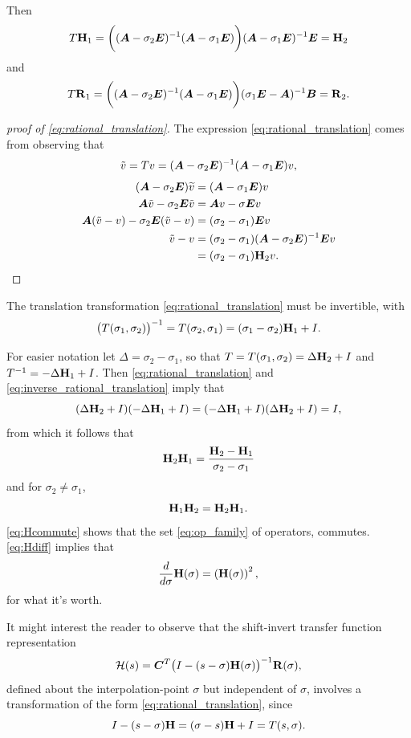 Then
\[
T \textbf{\textup{H}}_1 = \bigg((\bm{A}-\sigma_2 \bm{E})^{-1}(\bm{A}-\sigma_1 \bm{E}) \bigg) (\bm{A} - \sigma_1 \bm{E})^{-1}\bm{E} = \textbf{\textup{H}}_2
\]
and
\[
T \textbf{\textup{R}}_1 = \bigg((\bm{A}-\sigma_2 \bm{E})^{-1}(\bm{A}-\sigma_1 \bm{E}) \bigg) (\sigma_1 \bm{E}-\bm{A})^{-1}\bm{B} = \textbf{\textup{R}}_2.
\]


\begin{proof}[proof of \eqref{eq:rational_translation}]
The expression \eqref{eq:rational_translation} comes from observing that
\[
\tilde{v} = T v = (\bm{A}-\sigma_2 \bm{E})^{-1}(\bm{A}-\sigma_1 \bm{E})v, 
\]
\begin{align*}
(\bm{A}-\sigma_2 \bm{E})\widetilde{v} &= (\bm{A}-\sigma_1 \bm{E})v \\
\bm{A} \tilde{v}- \sigma_2 \bm{E} \tilde{v} &= \bm{A} v - \sigma \bm{E} v \\
\bm{A}(\tilde{v}-v) -\sigma_2\bm{E}(\tilde{v}-v) &= (\sigma_2-\sigma_1)\bm{E} v \\
\tilde{v}-v &=  (\sigma_2-\sigma_1) (\bm{A}-\sigma_2 \bm{E})^{-1}\bm{E} v \\
&=  (\sigma_2-\sigma_1)\textbf{\textup{H}}_2 v.
\end{align*}
\end{proof}

The translation transformation \eqref{eq:rational_translation} must be invertible, with 
\begin{equation}
\big( T(\sigma_1,\sigma_2)\big)^{-1} = T(\sigma_2,\sigma_1) = (\sigma_1-\sigma_2) \textbf{\textup{H}}_1 + I.
\label{eq:inverse_rational_translation}
\end{equation}

For easier notation let $\Delta=\sigma_2-\sigma_1$, so that $T=T(\sigma_1,\sigma_2)=\Delta \textbf{\textup{H}}_2 + I$ and $T^{-1}=-\Delta \textbf{\textup{H}}_1 + I$. Then \eqref{eq:rational_translation} and \eqref{eq:inverse_rational_translation} imply that 
\[
(\Delta \textbf{\textup{H}}_2 + I)(-\Delta \textbf{\textup{H}}_1 + I) = (-\Delta \textbf{\textup{H}}_1 + I) (\Delta \textbf{\textup{H}}_2 + I)=I,
\]
from which it follows that
\begin{equation}
 \textbf{\textup{H}}_2 \textbf{\textup{H}}_1 = \frac{\textbf{\textup{H}}_2 - \textbf{\textup{H}}_1}{\sigma_2 - \sigma_1}
\label{eq:Hdiff}
\end{equation}
and for $\sigma_2\neq\sigma_1$,
\begin{equation}
\textbf{\textup{H}}_1 \textbf{\textup{H}}_2 = \textbf{\textup{H}}_2 \textbf{\textup{H}}_1.
\label{eq:Hcommute}
\end{equation}
\eqref{eq:Hcommute} shows that the set \eqref{eq:op_family} of operators, commutes.   \eqref{eq:Hdiff} implies that 
\[
\frac{d}{d\sigma} \textbf{\textup{H}}(\sigma)=\left(\textbf{\textup{H}}(\sigma)\right)^2,
\]
 for what it's worth.  

It might interest the reader to observe that the shift-invert transfer function representation
\begin{equation}
\mathcal{H}(s) = \bm{C}^T\big(I - (s-\sigma) \textbf{\textup{H}}(\sigma)\big)^{-1}\textbf{\textup{R}}(\sigma),
\label{eq:tfsig}
\end{equation}
defined about the interpolation-point $\sigma$ but independent of $\sigma$, involves a transformation of the form \eqref{eq:rational_translation}, since 
\[
I - (s-\sigma) \textbf{\textup{H}} = (\sigma - s)\textbf{\textup{H}} + I=T(s,\sigma).
\]

